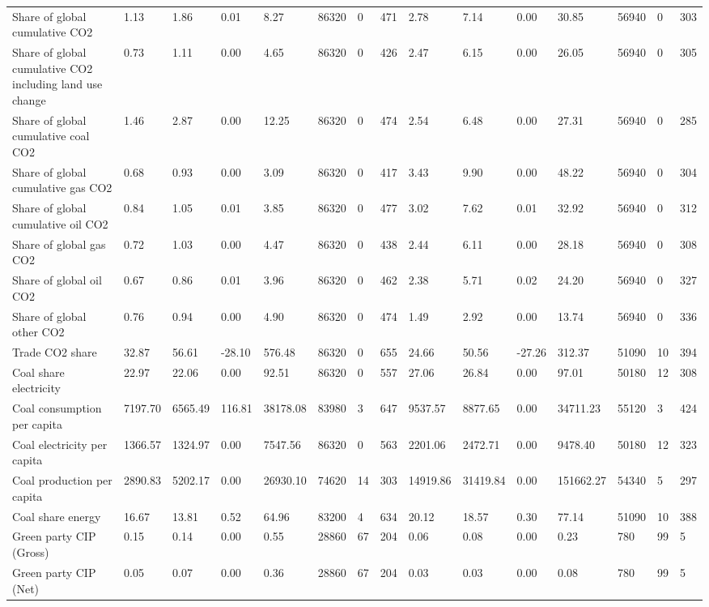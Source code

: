 \begin{longtable}{lllllllllllllll}
Share of global cumulative CO2 & 1.13 & 1.86 & 0.01 & 8.27 & 86320 & 0 & 471 & 2.78 & 7.14 & 0.00 & 30.85 & 56940 & 0 & 303\\
Share of global cumulative CO2 including land use change & 0.73 & 1.11 & 0.00 & 4.65 & 86320 & 0 & 426 & 2.47 & 6.15 & 0.00 & 26.05 & 56940 & 0 & 305\\
Share of global cumulative coal CO2 & 1.46 & 2.87 & 0.00 & 12.25 & 86320 & 0 & 474 & 2.54 & 6.48 & 0.00 & 27.31 & 56940 & 0 & 285\\
Share of global cumulative gas CO2 & 0.68 & 0.93 & 0.00 & 3.09 & 86320 & 0 & 417 & 3.43 & 9.90 & 0.00 & 48.22 & 56940 & 0 & 304\\
\addlinespace
Share of global cumulative oil CO2 & 0.84 & 1.05 & 0.01 & 3.85 & 86320 & 0 & 477 & 3.02 & 7.62 & 0.01 & 32.92 & 56940 & 0 & 312\\
Share of global gas CO2 & 0.72 & 1.03 & 0.00 & 4.47 & 86320 & 0 & 438 & 2.44 & 6.11 & 0.00 & 28.18 & 56940 & 0 & 308\\
Share of global oil CO2 & 0.67 & 0.86 & 0.01 & 3.96 & 86320 & 0 & 462 & 2.38 & 5.71 & 0.02 & 24.20 & 56940 & 0 & 327\\
Share of global other CO2 & 0.76 & 0.94 & 0.00 & 4.90 & 86320 & 0 & 474 & 1.49 & 2.92 & 0.00 & 13.74 & 56940 & 0 & 336\\
Trade CO2 share & 32.87 & 56.61 & -28.10 & 576.48 & 86320 & 0 & 655 & 24.66 & 50.56 & -27.26 & 312.37 & 51090 & 10 & 394\\
\addlinespace
Coal share electricity & 22.97 & 22.06 & 0.00 & 92.51 & 86320 & 0 & 557 & 27.06 & 26.84 & 0.00 & 97.01 & 50180 & 12 & 308\\
Coal consumption per capita & 7197.70 & 6565.49 & 116.81 & 38178.08 & 83980 & 3 & 647 & 9537.57 & 8877.65 & 0.00 & 34711.23 & 55120 & 3 & 424\\
Coal electricity per capita & 1366.57 & 1324.97 & 0.00 & 7547.56 & 86320 & 0 & 563 & 2201.06 & 2472.71 & 0.00 & 9478.40 & 50180 & 12 & 323\\
Coal production per capita & 2890.83 & 5202.17 & 0.00 & 26930.10 & 74620 & 14 & 303 & 14919.86 & 31419.84 & 0.00 & 151662.27 & 54340 & 5 & 297\\
Coal share energy & 16.67 & 13.81 & 0.52 & 64.96 & 83200 & 4 & 634 & 20.12 & 18.57 & 0.30 & 77.14 & 51090 & 10 & 388\\
\addlinespace
Green party CIP (Gross) & 0.15 & 0.14 & 0.00 & 0.55 & 28860 & 67 & 204 & 0.06 & 0.08 & 0.00 & 0.23 & 780 & 99 & 5\\
Green party CIP (Net) & 0.05 & 0.07 & 0.00 & 0.36 & 28860 & 67 & 204 & 0.03 & 0.03 & 0.00 & 0.08 & 780 & 99 & 5\\

\end{longtable}
